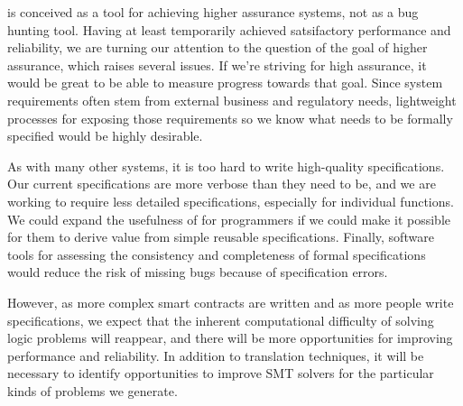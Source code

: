 
\MVP is conceived as a tool for achieving higher assurance systems, not as a bug
hunting tool. Having at least temporarily achieved satsifactory performance and
reliability, we are turning our attention to the question of the goal of higher
assurance, which raises several issues.  If we're striving for high assurance,
it would be great to be able to measure progress towards that goal.  Since
system requirements often stem from external business and regulatory needs,
lightweight processes for exposing those requirements so we know what needs to
be formally specified would be highly desirable.

As with many other systems, it is too hard to write high-quality specifications.
Our current specifications are more verbose than they need to be, and we are
working to require less detailed specifications, especially for individual
functions.  We could expand the usefulness of \MVP for programmers if we could
make it possible for them to derive value from simple reusable specifications.
Finally, software tools for assessing the consistency and completeness of formal
specifications would reduce the risk of missing bugs because of specification
errors.

However, as more complex smart contracts are written and as more people write
specifications, we expect that the inherent computational difficulty of solving
logic problems will reappear, and there will be more opportunities for improving
performance and reliability.  In addition to translation techniques, it will be
necessary to identify opportunities to improve SMT solvers for the particular
kinds of problems we generate.


